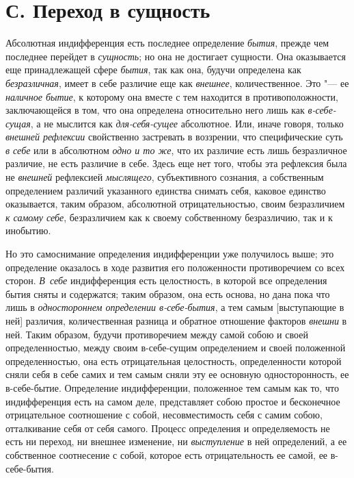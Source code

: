 \section[С. Переход в сущность]{С. Переход в сущность}
Абсолютная индифференция есть последнее
определение {\em бытия}, прежде чем последнее перейдет
в {\em сущность}; но она не достигает сущности. Она
оказывается еще принадлежащей сфере {\em бытия}, так
как она, будучи определена как {\em безразличная},
имеет в себе различие еще как {\em внешнее},
количественное. Это "--- ее {\em наличное бытие}, к
которому она вместе с тем находится в противоположности, заключающейся в
том, что она определена относительно него лишь как
{\em в-себе-сущая}, а не мыслится как
{\em для-себя-сущее} абсолютное. Или, иначе говоря,
только {\em внешней рефлексии} свойственно застревать в
воззрении, что специфические суть {\em в себе} или в
абсолютном {\em одно и то же}, что их различие есть
лишь безразличное различие, не есть различие в себе. Здесь еще нет того,
чтобы эта рефлексия была не {\em внешней} рефлексией
{\em мыслящего}, субъективного сознания, а собственным
определением различий указанного единства снимать себя, каковое единство
оказывается, таким образом, абсолютной отрицательностью, своим безразличием
{\em к самому себе}, безразличием как к своему
собственному безразличию, так и к инобытию.

Но это самоснимание определения индифференции уже получилось выше; это
определение оказалось в ходе развития его положенности противоречием со
всех сторон. {\em В~себе} индифференция есть
целостность, в которой все определения бытия сняты и содержатся; таким
образом, она есть основа, но дана пока что лишь в
{\em одностороннем определении в-себе-бытия}, а тем
самым [выступающие в ней] различия, количественная разница и обратное
отношение факторов {\em внешни} в ней. Таким образом,
будучи противоречием между самой собою и своей определенностью, между своим
в-себе-сущим определением и своей положенной определенностью, она есть
отрицательная целостность, определенности которой сняли себя в себе самих и
тем самым сняли эту ее основную односторонность, ее в-себе-бытие.
Определение индифференции, положенное тем самым как то, что индифференция
есть на самом деле, представляет собою простое и бесконечное отрицательное
соотношение с собой, несовместимость себя с самим собою, отталкивание себя
от себя самого. Процесс определения и определяемость не есть ни переход, ни
внешнее изменение, ни {\em выступление} в ней
определений, а ее собственное соотнесение с собой, которое есть
отрицательность ее самой, ее в-себе-бытия.


